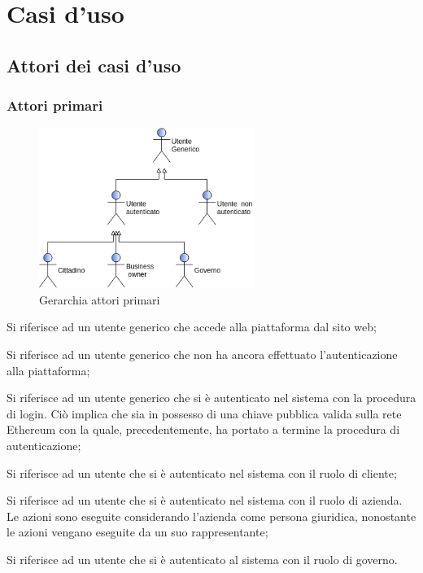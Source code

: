 \section{Casi d'uso} 
\subsection{Attori dei casi d'uso}
\subsubsection{Attori primari}
\begin{figure}[h]
	\includegraphics[width=7cm]{res/images/attori_primari.png}
	\centering
	\caption{Gerarchia attori primari}
\end{figure}
\begin{description}[style=nextline]
	\item[Utente Generico]
	Si riferisce ad un utente generico che accede alla piattaforma dal sito web;
	\item[Utente non autenticato]
	Si riferisce ad un utente generico che non ha ancora effettuato l'autenticazione alla piattaforma;
	\item[Utente autenticato]
	Si riferisce ad un utente generico che si è autenticato nel sistema con la procedura di login. Ciò implica che sia in possesso di una chiave pubblica valida sulla rete Ethereum con la quale, precedentemente, ha portato a termine la procedura di autenticazione;
	\item[Cittadino] Si riferisce ad un utente che si è autenticato nel sistema con il ruolo di cliente;
	\item[Azienda] Si riferisce ad un utente che si è autenticato nel sistema con il ruolo di azienda. Le azioni sono eseguite considerando l'azienda come persona giuridica, nonostante le azioni vengano eseguite da un suo rappresentante;
	\item[Governo\glo] Si riferisce ad un utente che si è autenticato al sistema con il ruolo di governo\glo.
\end{description}
